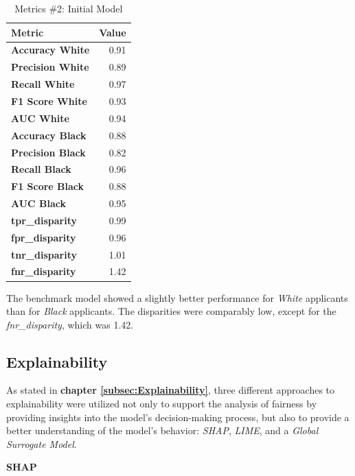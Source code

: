 \begin{table}[!htbp]
    \centering
    \begin{tabular}{lr}
    \toprule
    \textbf{Metric} & \textbf{Value} \\
    \midrule
    \textbf{Accuracy White} & 0.91 \\
    \textbf{Precision White} & 0.89 \\
    \textbf{Recall White} & 0.97 \\
    \textbf{F1 Score White} & 0.93 \\
    \textbf{AUC White} & 0.94 \\
    \midrule
    \textbf{Accuracy Black} & 0.88 \\
    \textbf{Precision Black} & 0.82 \\
    \textbf{Recall Black} & 0.96 \\
    \textbf{F1 Score Black} & 0.88 \\
    \textbf{AUC Black} & 0.95 \\
    \midrule
    \textbf{tpr\_disparity} & 0.99 \\
    \textbf{fpr\_disparity} & 0.96 \\
    \textbf{tnr\_disparity} & 1.01 \\
    \textbf{fnr\_disparity} & 1.42 \\
    \bottomrule
    \end{tabular}
    \caption{Metrics \#2: Initial Model}
    \label{tab:Fairness_Assessment_Initial}
    \small
    The benchmark model showed a slightly better performance for \textit{White} applicants than for \textit{Black} applicants. The disparities were comparably low, except for the \textit{fnr\_disparity}, which was 1.42.
\end{table}

\subsection{Explainability}\label{Explainability Results}

As stated in \textbf{chapter \ref{subsec:Explainability}}, three different approaches to explainability were utilized not only to support the analysis of fairness by providing insights into the model's decision-making process, but also to provide a better understanding of the model's behavior: \textit{SHAP}, \textit{LIME}, and a \textit{Global Surrogate Model}. 

\textbf{SHAP}

